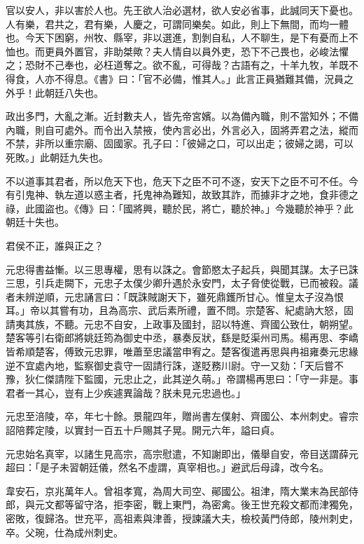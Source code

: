 \begin{pinyinscope}
 官以安人，非以害於人也。先王欲人治必選材，欲人安必省事，此誠同天下憂也。人有樂，君共之，君有樂，人慶之，可謂同樂矣。如此，則上下無間，而均一體也。今天下困窮，州牧、縣宰，非以選進，割剝自私，人不聊生，是下有憂而上不恤也。而更員外置官，非助桀歟？夫人情自以員外吏，恐下不己畏也，必峻法懼之；恐財不己奉也，必枉道奪之。欲不亂，可得哉？古語有之，十羊九牧，羊既不得食，人亦不得息。《書》曰：「官不必備，惟其人。」此言正員猶難其備，況員之外乎！此朝廷八失也。



 政出多門，大亂之漸。近封數夫人，皆先帝宮嬪。以為備內職，則不當知外；不備內職，則自可處外。而令出入禁掖，使內言必出，外言必入，固將弄君之法，縱而不禁，非所以重宗廟、固國家。孔子曰：「彼婦之口，可以出走；彼婦之謁，可以死敗。」此朝廷九失也。



 不以道事其君者，所以危天下也，危天下之臣不可不逐，安天下之臣不可不任。今有引鬼神、執左道以惑主者，托鬼神為難知，故致其詐，而據非才之地，食非德之祿，此國盜也。《傳》曰：「國將興，聽於民，將亡，聽於神。」今幾聽於神乎？此朝廷十失也。



 君侯不正，誰與正之？



 元忠得書益慚。以三思專權，思有以誅之。會節愍太子起兵，與聞其謀。太子已誅三思，引兵走闕下，元忠子太僕少卿升遇於永安門，太子脅使從戰，已而被殺。議者未辨逆順，元忠誦言曰：「既誅賊謝天下，雖死鼎鑊所甘心。惟皇太子沒為恨耳。」帝以其嘗有功，且為高宗、武后素所禮，置不問。宗楚客、紀處訥大怒，固請夷其族，不聽。元忠不自安，上政事及國封，詔以特進、齊國公致仕，朝朔望。楚客等引右衛郎將姚廷筠為御史中丞，暴奏反狀，繇是貶渠州司馬。楊再思、李嶠皆希順楚客，傅致元忠罪，唯蕭至忠議當申宥之。楚客復遣再思與冉祖雍奏元忠緣逆不宜處內地，監察御史袁守一固請行誅，遂貶務川尉。守一又劾：「天后嘗不豫，狄仁傑請陛下監國，元忠止之，此其逆久萌。」帝謂楊再思曰：「守一非是。事君者一其心，豈有上少疾遽異論哉？朕未見元忠過也。」



 元忠至涪陵，卒，年七十餘。景龍四年，贈尚書左僕射、齊國公、本州刺史。睿宗詔陪葬定陵，以實封一百五十戶賜其子晃。開元六年，謚曰貞。



 元忠始名真宰，以諸生見高宗，高宗慰遣，不知謝即出，儀舉自安，帝目送謂薛元超曰：「是子未習朝廷儀，然名不虛謂，真宰相也。」避武后母諱，改今名。



 韋安石，京兆萬年人。曾祖孝寬，為周大司空、鄖國公。祖津，隋大業末為民部侍郎，與元文都等留守洛，拒李密，戰上東門，為密禽。後王世充殺文都而津獨免，密敗，復歸洛。世充平，高祖素與津善，授諫議大夫，檢校黃門侍郎，陵州刺史，卒。父琬，仕為成州刺史。




\end{pinyinscope}
